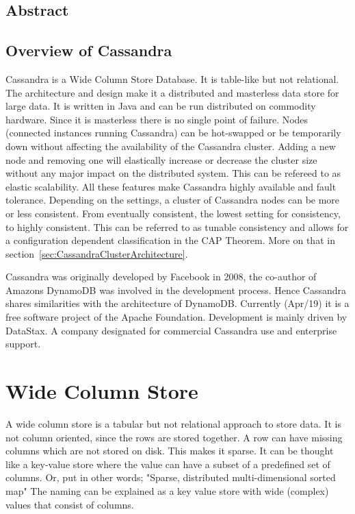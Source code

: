 \subsection{Abstract}
\subsection{Overview of Cassandra}
Cassandra is a Wide Column Store Database. It is table-like but not relational. The architecture and design make it a distributed and masterless data store for large data. It is written in Java and can be run distributed on commodity hardware. Since it is masterless there is no single point of failure. Nodes (connected instances running Cassandra) can be hot-swapped or be temporarily down without affecting the availability of the Cassandra cluster. Adding a new node and removing one will elastically increase or decrease the cluster size without any major impact on the distributed system. This can be refereed to as elastic scalability. All these features make Cassandra highly available and fault tolerance. Depending on the settings, a cluster of Cassandra nodes can be more or less consistent. From eventually consistent, the lowest setting for consistency, to highly consistent. This can be referred to as tunable consistency and allows for a configuration dependent classification in the CAP Theorem. More on that in section~\ref{sec:CassandraClusterArchitecture}.

Cassandra was originally developed by Facebook in 2008, the co-author of Amazons DynamoDB was involved in the development process. Hence Cassandra shares similarities with the architecture of DynamoDB. \autocite{cassandra_paper}
Currently (Apr/19) it is a free software project of the Apache Foundation. Development is mainly driven by DataStax. A company designated for commercial Cassandra use and enterprise support.

\section{Wide Column Store}

A wide column store is a tabular but not relational approach to store data. It is not column oriented, since the rows are stored together. A row can have missing columns which are not stored on disk. This makes it sparse.
It can be thought like a key-value store where the value can have a subset of a predefined set of columns. Or, put in other words; "Sparse, distributed multi-dimensional sorted map" \autocite{chang2008bigtable}
The naming can be explained as a key value store with wide (complex) values that consist of columns.

